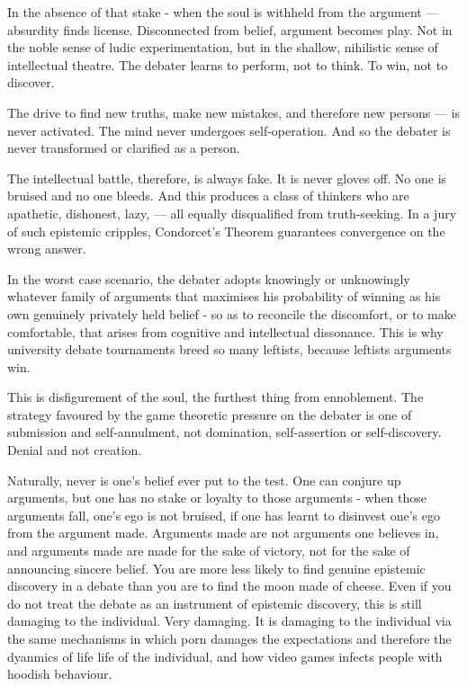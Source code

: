 \begin{itemize}
In the absence of that stake - when the soul is withheld from the argument — absurdity finds license. Disconnected from belief, argument becomes play. Not in the noble sense of ludic experimentation, but in the shallow, nihilistic sense of intellectual theatre. The debater learns to perform, not to think. To win, not to discover.

The drive to find new truths, make new mistakes, and therefore new persons — is never activated. The mind never undergoes self-operation. And so the debater is never transformed or clarified as a person.

The intellectual battle, therefore, is always fake. It is never gloves off. No one is bruised and no one bleeds. And this produces a class of thinkers who are apathetic, dishonest, lazy, — all equally disqualified from truth-seeking. In a jury of such epistemic cripples, Condorcet’s Theorem guarantees convergence on the wrong answer. 

In the worst case scenario, the debater adopts knowingly or unknowingly whatever family of arguments that maximises his probability of winning as his own genuinely privately held belief - so as to reconcile the discomfort, or to make comfortable, that arises from cognitive and intellectual dissonance. This is why university debate tournaments breed so many leftists, because leftists arguments win. 

This is disfigurement of the soul, the furthest thing from ennoblement. The strategy favoured by the game theoretic pressure on the debater is one of submission and self-annulment, not domination, self-assertion or self-discovery. Denial and not creation. 

Naturally, never is one's belief ever put to the test. One can conjure up arguments, but one has no stake or loyalty to those arguments - when those arguments fall, one's ego is not bruised, if one has learnt to disinvest one's ego from the argument made. Arguments made are not arguments one believes in, and arguments made are made for the sake of victory, not for the sake of announcing sincere belief. You are more less likely to find genuine epistemic discovery in a debate than you are to find the moon made of cheese. Even if you do not treat the debate as an instrument of epistemic discovery, this is still damaging to the individual. Very damaging. It is damaging to the individual via the same mechanisms in which porn damages the expectations and therefore the dyanmics of life life of the individual, and how video games infects people with hoodish behaviour. 


\end{itemize}
